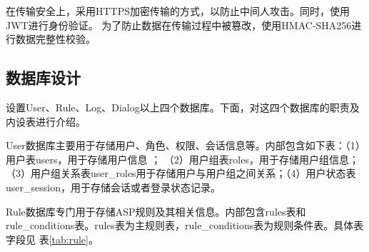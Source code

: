 在传输安全上，采用HTTPS加密传输的方式，以防止中间人攻击。同时，使用JWT进行身份验证。
为了防止数据在传输过程中被篡改，使用HMAC-SHA256进行数据完整性校验。

\subsection{数据库设计}
设置User、Rule、Log、Dialog以上四个数据库。下面，对这四个数据库的职责及内设表进行介绍。

User数据库主要用于存储用户、角色、权限、会话信息等。内部包含如下表：（1）用户表users，用于存储用户信息 ；
（2）用户组表roles，用于存储用户组信息；（3）用户组关系表user\_roles用于存储用户与用户组之间关系；（4）用户状态表user\_session，用于存储会话或者登录状态记录。

Rule数据库专门用于存储ASP规则及其相关信息。内部包含rules表和rule\_conditions表。rules表为主规则表，rule\_conditions表为规则条件表。具体表字段见
表\ref{tab:rule}。
\begin{table}[h]
    \centering
    \renewcommand{\arraystretch}{1.3} %
    \caption{rule表字段设置及说明}
    \label{tab:rule}
\end{table}
